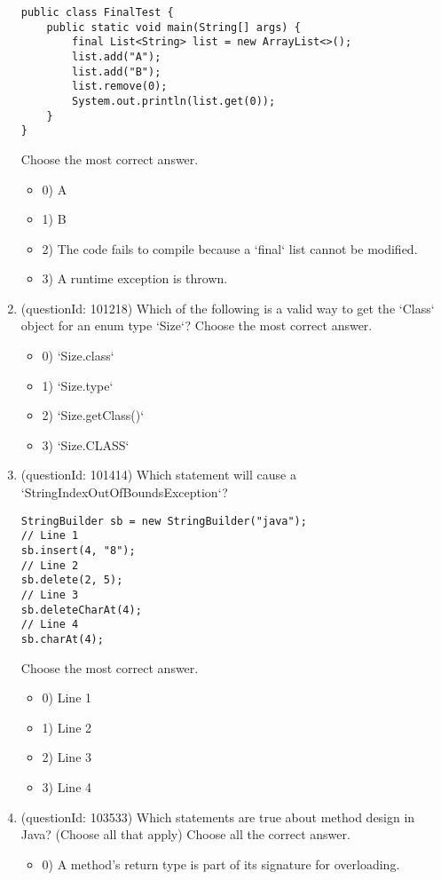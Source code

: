 \documentclass[12pt]{article}
\begin{document}
\begin{enumerate}[label=(\arabic*)]
\begin{verbatim}
public class FinalTest {
    public static void main(String[] args) {
        final List<String> list = new ArrayList<>();
        list.add("A");
        list.add("B");
        list.remove(0);
        System.out.println(list.get(0));
    }
}
\end{verbatim}
Choose the most correct answer. 
\begin{itemize}
\item 0) A

\item 1) B

\item 2) The code fails to compile because a `final` list cannot be modified.

\item 3) A runtime exception is thrown.

\end{itemize}
\item (questionId: 101218) Which of the following is a valid way to get the `Class` object for an enum type `Size`?
Choose the most correct answer. 
\begin{itemize}
\item 0) `Size.class`

\item 1) `Size.type`

\item 2) `Size.getClass()`

\item 3) `Size.CLASS`

\end{itemize}
\item (questionId: 101414) Which statement will cause a `StringIndexOutOfBoundsException`?
\begin{verbatim}
StringBuilder sb = new StringBuilder("java");
// Line 1
sb.insert(4, "8");
// Line 2
sb.delete(2, 5);
// Line 3
sb.deleteCharAt(4);
// Line 4
sb.charAt(4);
\end{verbatim}
Choose the most correct answer. 
\begin{itemize}
\item 0) Line 1

\item 1) Line 2

\item 2) Line 3

\item 3) Line 4

\end{itemize}
\item (questionId: 103533) Which statements are true about method design in Java? (Choose all that apply)
Choose all the correct answer.\begin{itemize}
\item 0) A method's return type is part of its signature for overloading.


\end{itemize}
\end{enumerate}
\end{document}
